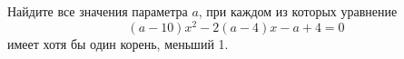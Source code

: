 \begin{ex}
	\begin{condition}
		Найдите все значения параметра \( a \), при каждом из которых уравнение
		\[ (a-10)x^2-2(a-4)x-a+4=0 \]
		имеет хотя бы один корень, меньший 1.
	\end{condition}
\end{ex}